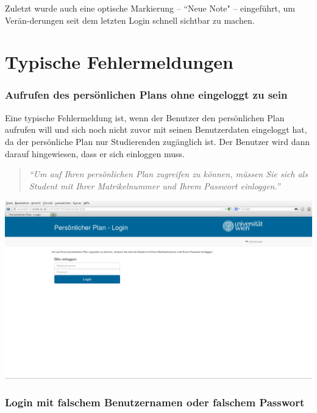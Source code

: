\documentclass[a4paper,10pt]{scrartcl}
\begin{document}
Zuletzt wurde auch eine optische Markierung – ``Neue Note" – eingeführt, um Verän-derungen seit dem letzten Login schnell sichtbar zu machen.

\section*{Typische Fehlermeldungen}

\subsubsection*{Aufrufen des persönlichen Plans ohne eingeloggt zu sein}

Eine typische Fehlermeldung ist, wenn der Benutzer den persönlichen Plan aufrufen will und sich noch nicht zuvor mit seinen Benutzerdaten eingeloggt hat,
da der persönliche Plan nur Studierenden zugänglich ist. Der Benutzer wird dann darauf hingewiesen, dass er sich einloggen muss.

\begin{quote}
 \textit{``Um auf Ihren persönlichen Plan zugreifen zu können, müssen Sie sich als Student mit Ihrer Matrikelnummer und Ihrem Passwort einloggen.''}
\end{quote} 

\begin{center}
 \includegraphics[scale=0.4]{./fehlermeldung1.png}
\end{center}


\subsubsection*{Login mit falschem Benutzernamen oder falschem Passwort}
\end{document}
